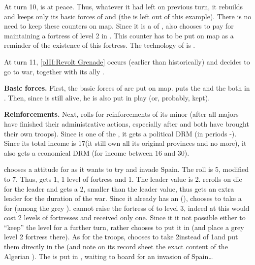 \begin{exemple}
  At turn 10, \paysAlgerie is at peace. Thus, whatever it had left on previous
  turn, it rebuilds and keeps only its basic forces of \ARMY\facemoins and
  \FLEET\facemoins (the \corsaire is left out of this example). There is no
  need to keep these counters on map. Since it is a \VASSAL of \TUR, \TUR also
  chooses to pay for maintaining a fortress of level 2 in
  \provinceAlgerie. This counter has to be put on map as a reminder of the
  existence of this fortress. The technology of \paysAlgerie is \TREN.

  At turn 11, \ref{pIII:Revolt Grenade} occurs (earlier than historically) and
  \TUR decides to go to war, together with its ally \paysAlgerie.

  \textbf{Basic forces.} First, the basic forces of \paysAlgerie are put on
  map. \TUR puts the \ARMY\facemoins and the \FLEET\facemoins both in
  \provinceAlgerie. Then, since  is still alive, he is also
  put in play (or, probably, kept).

  \textbf{Reinforcements.} Next, \TUR rolls for reinforcements of its minor
  (after all majors have finished their administrative actions, especially
  after \TUR and \HIS both have brought their own troops). Since \paysAlgerie
  is one of the \Barbaresques, it gets a  political DRM (in periods
  -). Since its total income is 17\ducats (it still own
  all its original provinces and no more), it also gets a 
  economical DRM (for income between 16 and 30\ducats).

  \TUR chooses a  attitude for \paysAlgerie as it wants to try
  and invade Spain. The roll is 5, modified to 7. Thus, \paysAlgerie gets
  1\LD, 1 level of fortress and 1\ND. The leader value is 2. \TUR rerolls on
  die for the leader and gets a 2, smaller than the leader value, thus
  \paysAlgerie gets an extra leader for the duration of the war. Since it
  already has an \LeaderA (), \TUR chooses to take a
  \LeaderG for \paysAlgerie (among the grey \anonyme\LeaderG). \TUR cannot
  raise the fortress of \provinceAlgerie to level 3, indeed at \TREN this
  would cost 2 levels of fortresses and \paysAlgerie received only one. Since
  it it not possible either to ``keep'' the level for a further turn, \TUR
  rather chooses to put it in \provinceOran (and place a grey level 2 fortress
  there). As for the troops, \TUR chooses to take 2\NGD instead of 1\ND and
  put them directly in the \FLEET (and note on its record sheet the exact
  content of the Algerian \FLEET). The \LD is put in \provinceAlgerie, waiting
  to board for an invasion of Spain\ldots
\end{exemple}


